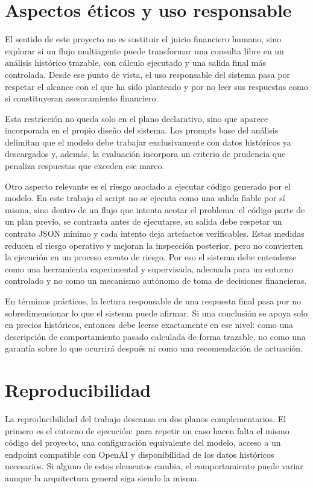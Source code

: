 \section{Aspectos \'eticos y uso responsable}

El sentido de este proyecto no es sustituir el juicio financiero humano, sino explorar si un flujo multiagente puede transformar una consulta libre en un an\'alisis hist\'orico
trazable, con c\'alculo ejecutado y una salida final m\'as controlada. Desde ese punto de vista, el uso responsable del sistema pasa por respetar el alcance con el que ha sido
planteado y por no leer sus respuestas como si constituyeran asesoramiento financiero.

Esta restricci\'on no queda solo en el plano declarativo, sino que aparece incorporada en el propio dise\~no del sistema. Los prompts base del an\'alisis delimitan que el
modelo debe trabajar exclusivamente con datos hist\'oricos ya descargados y, adem\'as, la evaluaci\'on incorpora un criterio de prudencia que penaliza respuestas que exceden
ese marco.

Otro aspecto relevante es el riesgo asociado a ejecutar c\'odigo generado por el modelo. En este trabajo el script no se ejecuta como una salida fiable por s\'i misma, sino
dentro de un flujo que intenta acotar el problema: el c\'odigo parte de un plan previo, se contrasta antes de ejecutarse, su salida debe respetar un contrato JSON m\'inimo y
cada intento deja artefactos verificables. Estas medidas reducen el riesgo operativo y mejoran la inspecci\'on posterior, pero no convierten la ejecuci\'on en un proceso exento
de riesgo. Por eso el sistema debe entenderse como una herramienta experimental y supervisada, adecuada para un entorno controlado y no como un mecanismo aut\'onomo de toma
de decisiones financieras.

En t\'erminos pr\'acticos, la lectura responsable de una respuesta final pasa por no sobredimensionar lo que el sistema puede afirmar. Si una conclusi\'on se apoya solo en precios
hist\'oricos, entonces debe leerse exactamente en ese nivel: como una descripci\'on de comportamiento pasado calculada de forma trazable, no como una garant\'ia sobre lo que
ocurrir\'a despu\'es ni como una recomendaci\'on de actuaci\'on.

\section{Reproducibilidad}

La reproducibilidad del trabajo descansa en dos planos complementarios. El primero es el entorno de ejecuci\'on: para repetir un caso hacen falta el mismo c\'odigo del proyecto,
una configuraci\'on equivalente del modelo, acceso a un endpoint compatible con OpenAI y disponibilidad de los datos hist\'oricos necesarios. Si alguno de estos elementos cambia,
el comportamiento puede variar aunque la arquitectura general siga siendo la misma.

